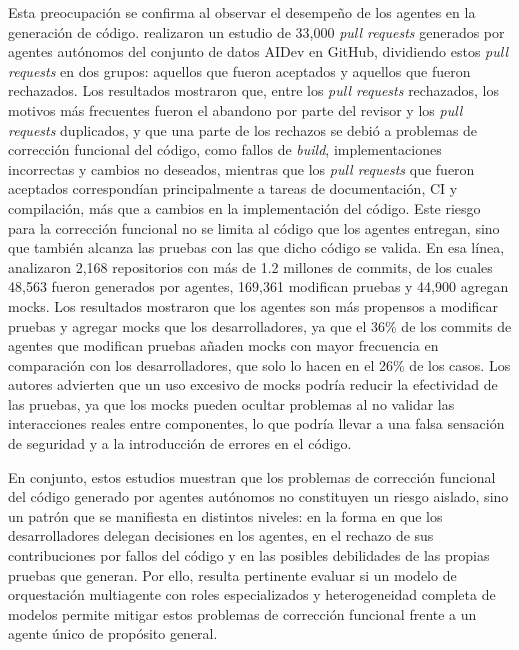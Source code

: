 Esta preocupación se confirma al observar el desempeño de los agentes en la generación de código. \textcite{ehsani2026failed} realizaron un estudio de 33,000 \textit{pull requests} generados por agentes autónomos del conjunto de datos AIDev en GitHub, dividiendo estos \textit{pull requests} en dos grupos: aquellos que fueron aceptados y aquellos que fueron rechazados. Los resultados mostraron que, entre los \textit{pull requests} rechazados, los motivos más frecuentes fueron el abandono por parte del revisor y los \textit{pull requests} duplicados, y que una parte de los rechazos se debió a problemas de corrección funcional del código, como fallos de \textit{build}, implementaciones incorrectas y cambios no deseados, mientras que los \textit{pull requests} que fueron aceptados correspondían principalmente a tareas de documentación, CI y compilación, más que a cambios en la implementación del código.
Este riesgo para la corrección funcional no se limita al código que los agentes entregan, sino que también alcanza las pruebas con las que dicho código se valida. En esa línea, \textcite{horarobbes2026mocks} analizaron 2,168 repositorios con más de 1.2 millones de commits, de los cuales 48,563 fueron generados por agentes, 169,361 modifican pruebas y 44,900 agregan mocks. Los resultados mostraron que los agentes son más propensos a modificar pruebas y agregar mocks que los desarrolladores, ya que el 36\% de los commits de agentes que modifican pruebas añaden mocks con mayor frecuencia en comparación con los desarrolladores, que solo lo hacen en el 26\% de los casos. Los autores advierten que un uso excesivo de mocks podría reducir la efectividad de las pruebas, ya que los mocks pueden ocultar problemas al no validar las interacciones reales entre componentes, lo que podría llevar a una falsa sensación de seguridad y a la introducción de errores en el código.

En conjunto, estos estudios muestran que los problemas de corrección funcional del código generado por agentes autónomos no constituyen un riesgo aislado, sino un patrón que se manifiesta en distintos niveles: en la forma en que los desarrolladores delegan decisiones en los agentes, en el rechazo de sus contribuciones por fallos del código y en las posibles debilidades de las propias pruebas que generan. Por ello, resulta pertinente evaluar si un modelo de orquestación multiagente con roles especializados y heterogeneidad completa de modelos permite mitigar estos problemas de corrección funcional frente a un agente único de propósito general.


